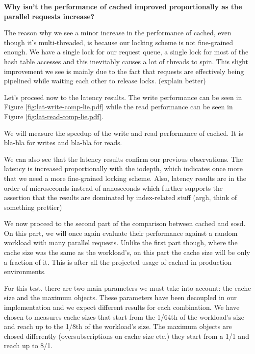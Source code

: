 \textbf{Why isn't the performance of cached improved proportionally as the 
	parallel requests increase?}

The reason why we see a minor increase in the performance of cached, even 
though it's multi-threaded, is because our locking scheme is not fine-grained 
enough. We have a single lock for our request queue, a single lock for most of 
the hash table accesses and this inevitably causes a lot of threads to spin.  
This slight improvement we see is mainly due to the fact that requests are 
effectively being pipelined while waiting each other to release locks. (explain 
better)

Let's proceed now to the latency results. The write performance can be seen in 
Figure \ref{fig:lat-write-comp-lie.pdf} while the read performance can be seen 
in Figure \ref{fig:lat-read-comp-lie.pdf}.


We will measure the speedup of the write and read performance of cached. It is 
bla-bla for writes and bla-bla for reads.

We can also see that the latency results confirm our previous observations. The 
latency is increased proportionally with the iodepth, which indicates once more 
that we need a more fine-grained locking scheme. Also, latency results are in 
the order of microseconds instead of nanoseconds which further supports the 
assertion that the results are dominated by index-related stuff (argh, think of 
something prettier)

We now proceed to the second part of the comparison between cached and sosd.  
On this part, we will once again evaluate their performance against a random 
workload with many parallel requests. Unlike the first part though, where the 
cache size was the same as the workload's, on this part the cache size will be 
only a fraction of it. This is after all the projected usage of cached in
production environments.

For this test, there are two main parameters we must take into account: the 
cache size and the maximum objects. These parameters have been decoupled in our 
implementation and we expect different results for each combination. We have 
chosen to measures cache sizes that start from the 1/64th of the workload's 
size and reach up to the 1/8th of the workload's size. The maximum objects are 
chosed differently (oversubscriptions on cache size etc.) they start from a 1/1 
and reach up to 8/1.

